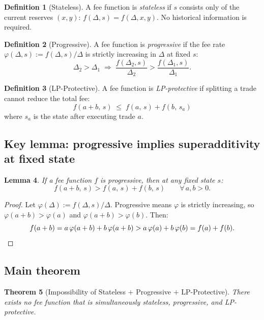 \documentclass[11pt]{article}
\newtheorem{theorem}{Theorem}[section]
\newtheorem{lemma}[theorem]{Lemma}
\theoremstyle{definition}
\newtheorem{definition}[theorem]{Definition}
\theoremstyle{remark}
\begin{document}
\begin{definition}[Stateless]
A fee function is \emph{stateless} if $s$ consists only of the current reserves $(x,y)$:
$f(\Delta,s)=f(\Delta,x,y)$.
No historical information is required.
\end{definition}

\begin{definition}[Progressive]
A fee function is \emph{progressive} if the fee rate $\varphi(\Delta,s):=f(\Delta,s)/\Delta$ is strictly increasing in $\Delta$ at fixed $s$:
\[
\Delta_2 > \Delta_1 \;\Longrightarrow\; \frac{f(\Delta_2,s)}{\Delta_2} > \frac{f(\Delta_1,s)}{\Delta_1}.
\]
\end{definition}

\begin{definition}[LP-Protective]
A fee function is \emph{LP-protective} if splitting a trade cannot reduce the total fee:
\[
f(a+b,\,s) \;\le\; f(a,\,s) + f(b,\,s_a)
\]
where $s_a$ is the state after executing trade $a$.
\end{definition}

\subsection{Key lemma: progressive implies superadditivity at fixed state}

\begin{lemma}\label{lem:prog-super}
If a fee function $f$ is progressive, then at any fixed state $s$:
\[
f(a+b,\,s) > f(a,\,s) + f(b,\,s) \qquad\forall\, a,b>0.
\]
\end{lemma}

\begin{proof}
Let $\varphi(\Delta):=f(\Delta,s)/\Delta$. Progressive means $\varphi$ is strictly increasing, so $\varphi(a+b)>\varphi(a)$ and $\varphi(a+b)>\varphi(b)$. Then:
\[
f(a+b) = a\,\varphi(a+b) + b\,\varphi(a+b) > a\,\varphi(a) + b\,\varphi(b) = f(a)+f(b). \qedhere
\]
\end{proof}

\subsection{Main theorem}

\begin{theorem}[Impossibility of Stateless $+$ Progressive $+$ LP-Protective]\label{thm:impossibility}
There exists no fee function that is simultaneously stateless, progressive, and LP-protective.
\end{theorem}
\end{document}
